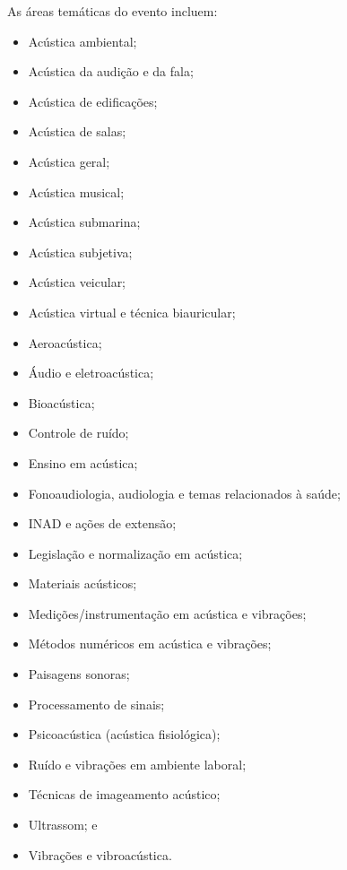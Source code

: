 \vspace{5pt}

As áreas temáticas do evento incluem:
%	
\begin{itemize}[noitemsep,topsep=-0.25ex] \itemsep=1.5pt
\item[\textbullet] Acústica ambiental;
\item[\textbullet] Acústica da audição e da fala;
\item[\textbullet] Acústica de edificações;
\item[\textbullet] Acústica de salas;
\item[\textbullet] Acústica geral;
\item[\textbullet] Acústica musical;
\item[\textbullet] Acústica submarina;
\item[\textbullet] Acústica subjetiva;
\item[\textbullet] Acústica veicular;
\item[\textbullet] Acústica virtual e técnica biauricular;
\item[\textbullet] Aeroacústica;
\item[\textbullet] Áudio e eletroacústica;
\item[\textbullet] Bioacústica;
\item[\textbullet] Controle de ruído;
\item[\textbullet] Ensino em acústica;
\item[\textbullet] Fonoaudiologia, audiologia e temas relacionados à saúde;
\item[\textbullet] INAD e ações de extensão;
\item[\textbullet] Legislação e normalização em acústica;
\item[\textbullet] Materiais acústicos;
\item[\textbullet] Medições/instrumentação em acústica e vibrações;
\item[\textbullet] Métodos numéricos em acústica e vibrações;
\item[\textbullet] Paisagens sonoras;
\item[\textbullet] Processamento de sinais;
\item[\textbullet] Psicoacústica (acústica fisiológica);
\item[\textbullet] Ruído e vibrações em ambiente laboral;
\item[\textbullet] Técnicas de imageamento acústico;
\item[\textbullet] Ultrassom; e
\item[\textbullet] Vibrações e vibroacústica.
\end{itemize}
	

